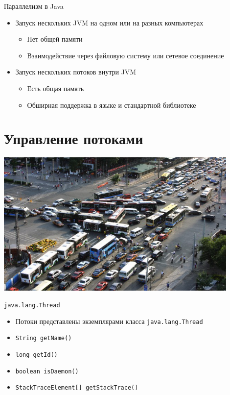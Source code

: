 \documentclass[unicode,mathserif]{beamer}
\begin{document}
\begin{frame}{Параллелизм в Java}
\begin{itemize}
\item Запуск нескольких JVM на одном или на разных компьютерах
    \begin{itemize}
    \item Нет общей памяти
    \item Взаимодействие через файловую систему или сетевое соединение
    \end{itemize}
    \bigskip
    \pause

\item Запуск нескольких потоков внутри JVM
    \begin{itemize}
    \item Есть общая память
    \item Обширная поддержка в языке и стандартной библиотеке
    \end{itemize}
\end{itemize}
\end{frame}


\section{Управление потоками}

\begin{frame}
\centering
\includegraphics[width=0.9\textwidth]{pics/multithreading.jpg}
\end{frame}


\begin{frame}{\texttt{java.lang.Thread}}
\begin{itemize}
\item Потоки представлены экземплярами класса \texttt{java.lang.Thread}
    \bigskip

\item \lstinline|String getName()|
\item \lstinline|long getId()|
\item \lstinline|boolean isDaemon()|
\item \lstinline|StackTraceElement[] getStackTrace()|
\end{itemize}
\end{frame}
\end{document}
